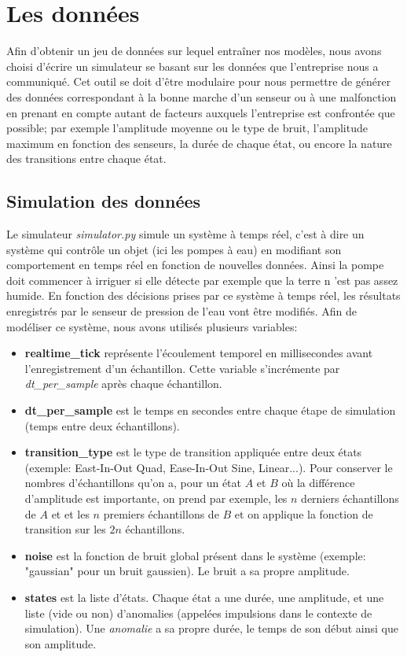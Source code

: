 \documentclass[french]{article}
\theoremstyle{mytheoremstyle}
\theoremstyle{mytheoremstyle}
\theoremstyle{myproblemstyle}
\begin{document}
    \section{Les données}
    Afin d'obtenir un jeu de données sur lequel entraîner nos modèles, nous avons choisi d'écrire un simulateur se basant sur les données que l'entreprise nous a communiqué. Cet outil se doit d'être modulaire pour nous permettre de générer des données correspondant à la bonne marche d'un senseur ou à une malfonction en prenant en compte autant de facteurs auxquels l'entreprise est confrontée que possible; par exemple l'amplitude moyenne ou le type de bruit, l'amplitude maximum en fonction des senseurs, la durée de chaque état, ou encore la nature des transitions entre chaque état.
        \subsection{Simulation des données}
       
        Le simulateur \textit{simulator.py} simule un système à temps réel, c'est à dire un système qui contrôle un objet (ici les pompes à eau) en modifiant son comportement en temps réel en fonction de nouvelles données. Ainsi la pompe doit commencer à irriguer si elle détecte par exemple que la terre n 'est pas assez humide. En fonction des décisions prises par ce système à temps réel, les résultats enregistrés par le senseur de pression de l'eau vont être modifiés. Afin de modéliser ce système, nous avons utilisés plusieurs variables:
        \begin{itemize}[label={•}]
            \item \textbf{realtime\_tick} représente l'écoulement temporel en millisecondes avant l'enregistrement d'un échantillon. Cette variable s'incrémente par \textit{dt\_per\_sample} après chaque échantillon.
            \item \textbf{dt\_per\_sample} est le temps en secondes entre chaque étape de simulation (temps entre deux échantillons).
            \item \textbf{transition\_type} est le type de transition appliquée entre deux états (exemple: East-In-Out Quad, Ease-In-Out Sine, Linear...). Pour conserver le nombres d'échantillons qu'on a, pour un état $A$ et $B$ où la différence d'amplitude est importante, on prend par exemple, les $n$ derniers échantillons de $A$ et et les $n$ premiers échantillons de $B$ et on applique la fonction de transition sur les $2n$ échantillons.
            \item \textbf{noise} est la fonction de bruit global présent dans le système (exemple: "gaussian" pour un bruit gaussien). Le bruit a sa propre amplitude. 
            \item \textbf{states} est la liste d'états. Chaque état a une durée, une amplitude, et une liste (vide ou non) d'anomalies (appelées impulsions dans le contexte de simulation). Une \textit{anomalie} a sa propre durée, le temps de son début ainsi que son amplitude.
        \end{itemize}
\end{document}
